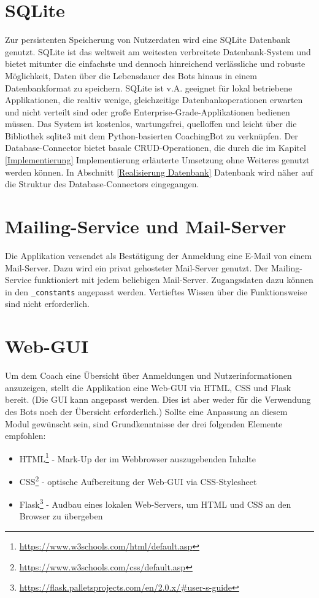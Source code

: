     \section{SQLite}
        Zur persistenten Speicherung von Nutzerdaten wird eine SQLite Datenbank \cite{sqlite} genutzt. SQLite ist das weltweit am weitesten verbreitete Datenbank-System und bietet mitunter die einfachste und dennoch hinreichend verlässliche und robuste Möglichkeit, Daten über die Lebensdauer des Bots hinaus in einem Datenbankformat zu speichern. SQLite ist v.A. geeignet für lokal betriebene Applikationen, die realtiv wenige, gleichzeitige Datenbankoperationen erwarten und nicht verteilt sind oder große Enterprise-Grade-Applikationen bedienen müssen. Das System ist kostenlos, wartungsfrei, quelloffen und leicht über die Bibliothek sqlite3 \cite{sqlite3API} mit dem Python-basierten CoachingBot zu verknüpfen. Der Database-Connector bietet basale CRUD-Operationen, die durch die im Kapitel \ref{Implementierung} Implementierung erläuterte Umsetzung ohne Weiteres genutzt werden können. In Abschnitt \ref{Realisierung Datenbank} Datenbank wird näher auf die Struktur des Database-Connectors eingegangen. 


    \section{Mailing-Service und Mail-Server}
        Die Applikation versendet als Bestätigung der Anmeldung eine E-Mail von einem Mail-Server. Dazu wird ein privat gehosteter Mail-Server genutzt. Der Mailing-Service funktioniert mit jedem beliebigen Mail-Server. Zugangsdaten dazu können in den \verb|_constants| angepasst werden. Vertieftes Wissen über die Funktionsweise sind nicht erforderlich.


    \section{Web-GUI}
        Um dem Coach eine Übersicht über Anmeldungen und Nutzerinformationen anzuzeigen, stellt die Applikation eine Web-GUI via HTML, CSS und Flask bereit. (Die GUI kann angepasst werden. Dies ist aber weder für die Verwendung des Bots noch der Übersicht erforderlich.) Sollte eine Anpassung an diesem Modul gewünscht sein, sind Grundkenntnisse der drei folgenden Elemente empfohlen: 
        \begin{itemize}
            \item HTML\footnote{\url{https://www.w3schools.com/html/default.asp}} - Mark-Up der im Webbrowser auszugebenden Inhalte
            \item CSS\footnote{\url{https://www.w3schools.com/css/default.asp}} - optische Aufbereitung der Web-GUI via CSS-Stylesheet
            \item Flask\footnote{\url{https://flask.palletsprojects.com/en/2.0.x/\#user-s-guide}} - Audbau eines lokalen Web-Servers, um HTML und CSS an den Browser zu übergeben
        \end{itemize}    

